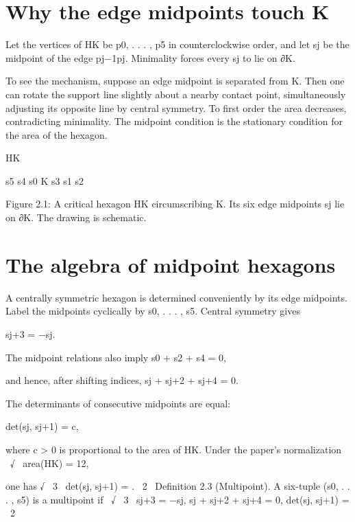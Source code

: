 \section{Why the edge midpoints touch K}

Let the vertices of HK be p0, . . . , p5 in counterclockwise order, and let sj be the midpoint of the edge pj−1pj. Minimality forces every sj to lie on ∂K.


To see the mechanism, suppose an edge midpoint is separated from K. Then one can rotate the support line slightly about a nearby contact point, simultaneously adjusting its opposite line by central symmetry. To first order the area decreases, contradicting minimality. The midpoint condition is the stationary condition for the area of the hexagon.


HK


s5 s4 s0 K s3 s1 s2


\begin{figureplaceholder}
Figure 2.1: A critical hexagon HK circumscribing K. Its six edge midpoints sj lie on ∂K. The drawing is schematic.
\end{figureplaceholder}

\section{The algebra of midpoint hexagons}

A centrally symmetric hexagon is determined conveniently by its edge midpoints. Label the midpoints cyclically by s0, . . . , s5. Central symmetry gives


sj+3 = −sj.


The midpoint relations also imply s0 + s2 + s4 = 0,


and hence, after shifting indices, sj + sj+2 + sj+4 = 0.


The determinants of consecutive midpoints are equal:


det(sj, sj+1) = c,


\begin{displaytext}
where c > 0 is proportional to the area of HK. Under the paper’s normalization \
√ \
area(HK) = 12,
\end{displaytext}

\begin{displaytext}
one has √ \
3 \
det(sj, sj+1) = . \
2 \
Definition 2.3 (Multipoint). A six-tuple (s0, . . . , s5) is a multipoint if \
√ \
3 \
sj+3 = −sj, sj + sj+2 + sj+4 = 0, det(sj, sj+1) = \
2
\end{displaytext}

